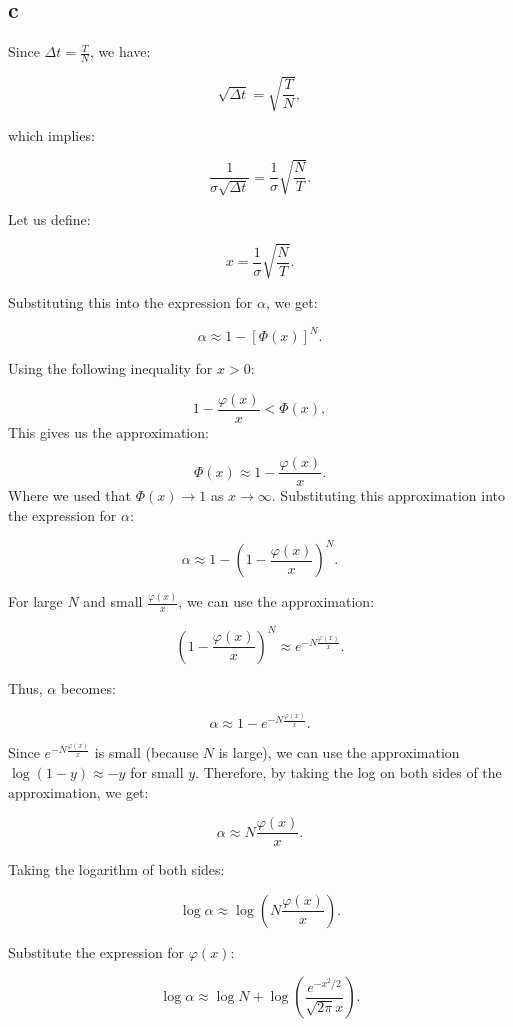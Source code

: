 \documentclass[a4paper,12pt]{article} %
\begin{document}
\subsection{c}

Since $\Delta t = \frac{T}{N}$, we have:

\[
    \sqrt{\Delta t} = \sqrt{\frac{T}{N}},
\]

which implies:

\[
    \frac{1}{\sigma \sqrt{\Delta t}} = \frac{1}{\sigma} \sqrt{\frac{N}{T}}.
\]

Let us define:

\[
    x = \frac{1}{\sigma} \sqrt{\frac{N}{T}}.
\]

Substituting this into the expression for $\alpha$, we get:

\[
    \alpha \approx 1 - \left[ \Phi(x) \right]^N.
\]


Using the following inequality for $x > 0$:

\[
    1 - \frac{\varphi(x)}{x} < \Phi(x),
\]
This gives us the approximation:

\[
    \Phi(x) \approx 1 - \frac{\varphi(x)}{x}.
\]
Where we used that \(\Phi (x) \to 1 \) as \(x\to \infty \).
Substituting this approximation into the expression for $\alpha$:

\[
    \alpha \approx 1 - \left(1 - \frac{\varphi(x)}{x} \right)^N.
\]

For large $N$ and small $\frac{\varphi(x)}{x}$, we can use the approximation:

\[
    \left(1 - \frac{\varphi(x)}{x} \right)^N \approx e^{-N \frac{\varphi(x)}{x}}.
\]

Thus, $\alpha$ becomes:

\[
    \alpha \approx 1 - e^{-N \frac{\varphi(x)}{x}}.
\]


Since $e^{-N \frac{\varphi(x)}{x}}$ is small (because $N$ is large), we can use the approximation $\log(1 - y) \approx -y$ for small $y$. Therefore, by taking the log on both sides of the approximation, we get:

\[
    \alpha \approx N \frac{\varphi(x)}{x}.
\]

Taking the logarithm of both sides:

\[
    \log \alpha \approx \log \left( N \frac{\varphi(x)}{x} \right).
\]

Substitute the expression for $\varphi(x)$:

\[
    \log \alpha \approx \log N + \log \left( \frac{e^{-x^2 / 2}}{\sqrt{2\pi} x} \right).
\]
\end{document}
